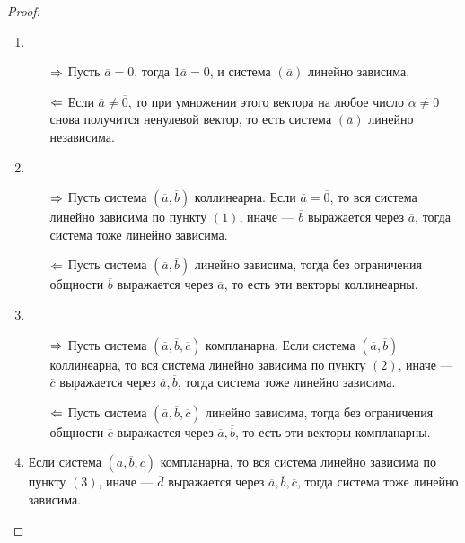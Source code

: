     \begin{proof}~
    	\begin{enumerate}
    		\item\begin{itemize}
    				\item[$\Rightarrow$] Пусть $\overline{a} = \overline{0}$, тогда $1\overline{a} = \overline{0}$, и система $(\overline{a})$ линейно зависима.
    				\item[$\Leftarrow$]Если $\overline{a} \ne \overline{0}$, то при умножении этого вектора на любое число $\alpha \ne 0$ снова получится ненулевой вектор, то есть система $(\overline{a})$ линейно независима.
    			\end{itemize}
    		\item\begin{itemize}
    			\item[$\Rightarrow$] Пусть система $(\overline{a}, \overline{b})$ коллинеарна. Если $\overline{a} = \overline{0}$, то вся система линейно зависима по пункту $(1)$, иначе --- $\overline{b}$ выражается через $\overline{a}$, тогда система тоже линейно зависима.
    			\item[$\Leftarrow$] Пусть система $(\overline{a}, \overline{b})$ линейно зависима, тогда без ограничения общности $\overline{b}$ выражается через $\overline{a}$, то есть эти векторы коллинеарны.
    		\end{itemize}
    	
    		\item\begin{itemize}
    			\item[$\Rightarrow$] Пусть система $(\overline{a}, \overline{b}, \overline{c})$ компланарна. Если система $(\overline{a}, \overline{b})$ коллинеарна, то вся система линейно зависима по пункту $(2)$, иначе --- $\overline{c}$ выражается через  $\overline{a}, \overline{b}$, тогда система тоже линейно зависима.
    			\item[$\Leftarrow$]Пусть система $(\overline{a}, \overline{b}, \overline{c})$ линейно зависима, тогда без ограничения общности $\overline{c}$ выражается через $\overline{a}, \overline{b}$, то есть эти векторы компланарны.\qedhere
    		\end{itemize}
    	
    		\item Если система $(\overline{a}, \overline{b}, \overline{c})$ компланарна, то вся система линейно зависима по пункту $(3)$, иначе --- $\overline{d}$ выражается через $\overline{a}, \overline{b}, \overline{c}$, тогда система тоже линейно зависима.
    	\end{enumerate}
    \end{proof}
    
